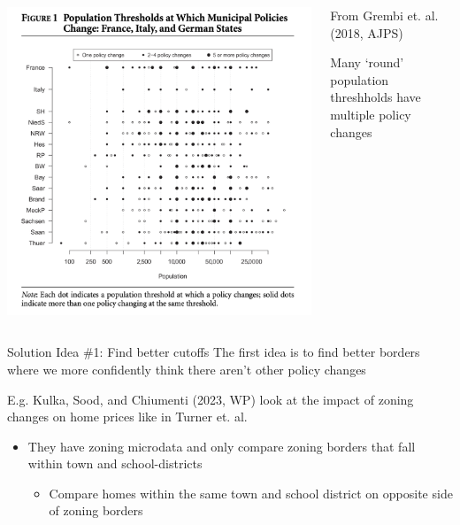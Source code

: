 \documentclass[aspectratio=169,t,11pt,table]{beamer}
\begin{document}
\begin{frame}{}
  \begin{columns}[T]
    \begin{column}{0.53\textwidth}
      \includegraphics[width = \textwidth]{figures/grembi_et_al_2018.png}
    \end{column}
    \hfill
    \begin{column}{0.45\textwidth}
      \bigskip
      From Grembi et. al. (2018, AJPS)
      
      \bigskip
      Many `round' population threshholds have multiple policy changes
    \end{column}
  \end{columns}
\end{frame}


\begin{frame}{Solution Idea \#1: Find better cutoffs}
  The first idea is to find better borders where we more confidently think there aren't other policy changes

  \bigskip
  E.g. Kulka, Sood, and Chiumenti (2023, WP) look at the impact of zoning changes on home prices like in Turner et. al.
  \begin{itemize}
    \item They have zoning microdata and only compare zoning borders that fall within town and school-districts 
    \begin{itemize}
      \item Compare homes within the same town and school district on opposite side of zoning borders
    \end{itemize}
  \end{itemize}

\end{frame}
\end{document}
